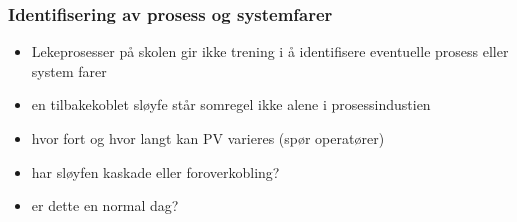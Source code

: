 \documentclass[aspectratio=169,xcolor=dvipsnames]{beamer}
\begin{document}
%
%
%
%
%
%
%
	\begin{frame}
		\frametitle{Identifisering av prosess og systemfarer}
		\begin{itemize}

		
	\item Lekeprosesser på skolen gir ikke trening i å identifisere eventuelle prosess eller system farer
	\item en tilbakekoblet sløyfe står somregel ikke alene i prosessindustien
	\item hvor fort og hvor langt kan PV varieres (spør operatører)
	\item har sløyfen kaskade eller foroverkobling?
	\item er dette en normal dag?
		\end{itemize}
	\end{frame}
\end{document}

